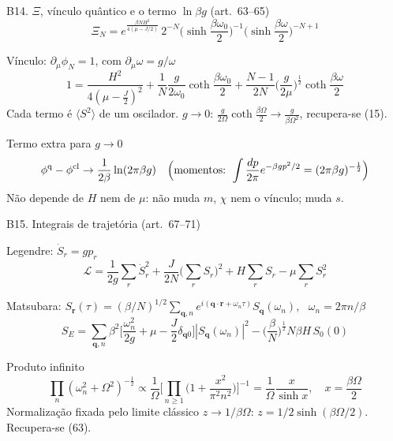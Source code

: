 \documentclass[10pt,aspectratio=169]{beamer}
\newcommand{\eq}[1]{\textcolor{qcdBlue!70!black}{\small(#1)}}
\begin{document}
\begin{frame}{B14. $\Xi$, vínculo quântico e o termo $\ln\beta g$ \eq{art.~63--65}}
  \footnotesize
  \[\Xi_N=e^{\frac{\beta NH^2}{4(\mu-J/2)}}\,2^{-N}\Big(\sinh\frac{\beta\omega_0}2\Big)^{-1}\Big(\sinh\frac{\beta\omega}2\Big)^{-N+1}\]
  \begin{block}{Vínculo: $\partial_\mu\phi_N=1$, com $\partial_\mu\omega=g/\omega$}
    \[1=\frac{H^2}{4(\mu-\frac J2)^2}+\frac1N\frac g{2\omega_0}\coth\frac{\beta\omega_0}2+\frac{N-1}{2N}\Big(\frac g{2\mu}\Big)^{\frac12}\coth\frac{\beta\omega}2\]
    Cada termo é $\langle S^2\rangle$ de um oscilador. $g\to0$: $\frac g{2\Omega}\coth\frac{\beta\Omega}2\to\frac g{\beta\Omega^2}$, recupera-se (15).
  \end{block}
  \begin{block}{Termo extra para $g\to0$}
    \[\phi^{\rm q}-\phi^{\rm cl}\to\frac1{2\beta}\ln(2\pi\beta g)\quad
      \Big(\text{momentos: }\int\frac{dp}{2\pi}e^{-\beta gp^2/2}=(2\pi\beta g)^{-\frac12}\Big)\]
    Não depende de $H$ nem de $\mu$: não muda $m$, $\chi$ nem o vínculo; muda $s$.
  \end{block}
\end{frame}

\begin{frame}{B15. Integrais de trajetória \eq{art.~67--71}}
  \footnotesize
  \begin{block}{Legendre: $\dot S_r=gp_r$}
    \[\mathcal L=\frac1{2g}\sum_r\dot S_r^2+\frac J{2N}\Big(\sum_rS_r\Big)^2+H\sum_rS_r-\mu\sum_rS_r^2\]
  \end{block}
  \begin{block}{Matsubara: $S_{\mathbf r}(\tau)=(\beta/N)^{1/2}\sum_{\mathbf q,n}e^{i(\mathbf q\cdot\mathbf r+\omega_n\tau)}S_{\mathbf q}(\omega_n)$, \ $\omega_n=2\pi n/\beta$}
    \[S_E=\sum_{\mathbf q,n}\beta^2\Big[\frac{\omega_n^2}{2g}+\mu-\frac J2\delta_{\mathbf q0}\Big]|S_{\mathbf q}(\omega_n)|^2-\Big(\frac\beta N\Big)^{\frac12}N\beta H\,S_0(0)\]
  \end{block}
  \begin{block}{Produto infinito}
    \[\prod_n(\omega_n^2+\Omega^2)^{-\frac12}\propto\frac1\Omega\Big[\prod_{n\ge1}\Big(1+\frac{x^2}{\pi^2n^2}\Big)\Big]^{-1}=\frac1\Omega\frac{x}{\sinh x},\quad x=\frac{\beta\Omega}2\]
    Normalização fixada pelo limite clássico $z\to1/\beta\Omega$: $z=1/2\sinh(\beta\Omega/2)$. Recupera-se (63).
  \end{block}
\end{frame}
\end{document}
